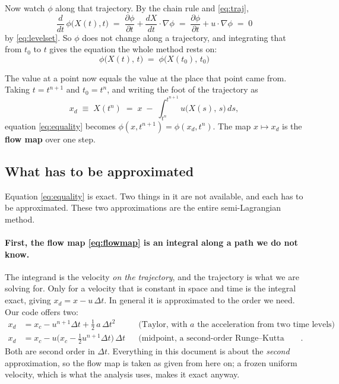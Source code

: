 \documentclass[11pt,a4paper]{article}
\begin{document}
Now watch \(\phi\) along that trajectory. By the chain rule and \eqref{eq:traj},
\begin{equation}
  \frac{d}{dt}\,\phi\bigl(X(t),t\bigr)
  \;=\; \frac{\partial\phi}{\partial t} + \frac{dX}{dt}\cdot\nabla\phi
  \;=\; \frac{\partial\phi}{\partial t} + u\cdot\nabla\phi
  \;=\; 0
\end{equation}
by \eqref{eq:levelset}. So \(\phi\) does not change along a trajectory, and integrating that
from \(t_0\) to \(t\) gives the equation the whole method rests on:
\begin{equation}
  \boxed{\;\phi\bigl(X(t),\,t\bigr) \;=\; \phi\bigl(X(t_0),\,t_0\bigr)\;}
  \label{eq:equality}
\end{equation}

The value at a point now equals the value at the place that point came from. Taking
\(t = t^{n+1}\) and \(t_0 = t^n\), and writing the foot of the trajectory as
\begin{equation}
  x_d \;\equiv\; X(t^n) \;=\; x \;-\; \int_{t^n}^{t^{n+1}} u\bigl(X(s),\,s\bigr)\,ds ,
  \label{eq:flowmap}
\end{equation}
equation \eqref{eq:equality} becomes \(\phi(x,t^{n+1}) = \phi(x_d,t^n)\). The map
\(x \mapsto x_d\) is the \textbf{flow map} over one step.

\subsection{What has to be approximated}

Equation \eqref{eq:equality} is exact. Two things in it are not available, and each has to be
approximated. These two approximations are the entire semi-Lagrangian method.

\paragraph{First, the flow map \eqref{eq:flowmap} is an integral along a path we do not know.}
The integrand is the velocity \emph{on the trajectory}, and the trajectory is what we are
solving for. Only for a velocity that is constant in space and time is the integral exact,
giving \(x_d = x - u\,\Delta t\). In general it is approximated to the order we need. Our code
offers two:
\begin{align}
  x_d &= x_c - u^{n+1}\Delta t + \tfrac12\,a\,\Delta t^2
        &&\text{(Taylor, with \(a\) the acceleration from two time levels)},\\
  x_d &= x_c - u\bigl(x_c - \tfrac12 u^{n+1}\Delta t\bigr)\,\Delta t
        &&\text{(midpoint, a second-order Runge--Kutta step)} .
\end{align}
Both are second order in \(\Delta t\). Everything in this document is about the \emph{second}
approximation, so the flow map is taken as given from here on; a frozen uniform velocity, which
is what the analysis uses, makes it exact anyway.
\end{document}
